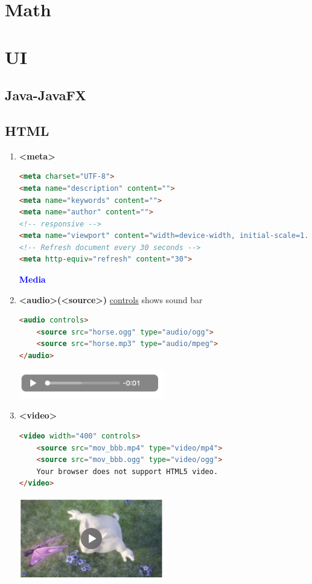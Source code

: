 \documentclass[12pt, a4paper]{report}
\begin{document}
\section{Math}




\section{UI}
    \subsection{Java-JavaFX}
    \subsection{HTML}
    \begin{enumerate}
        \item \textbf{<meta>}
        \begin{lstlisting}[language=HTML]
<meta charset="UTF-8">
<meta name="description" content="">
<meta name="keywords" content="">
<meta name="author" content="">
<!-- responsive -->
<meta name="viewport" content="width=device-width, initial-scale=1.0">
<!-- Refresh document every 30 seconds -->
<meta http-equiv="refresh" content="30">
        \end{lstlisting}
        
        \large{\textcolor{blue}{\textbf{Media}}}
        \item \textbf{<audio>(<source>)}
        \underline{controls} shows sound bar
        \begin{lstlisting}[language=HTML]
<audio controls>
    <source src="horse.ogg" type="audio/ogg">
    <source src="horse.mp3" type="audio/mpeg">
</audio>
        \end{lstlisting}
        \includegraphics[width=0.5\textwidth]{imgs/html_audio.png}
        
        \item \textbf{<video>}
        \begin{lstlisting}[language=HTML]
<video width="400" controls>
    <source src="mov_bbb.mp4" type="video/mp4">
    <source src="mov_bbb.ogg" type="video/ogg">
    Your browser does not support HTML5 video.
</video>
        \end{lstlisting}
        \includegraphics[width=0.5\textwidth]{imgs/html_video.png}
        

\end{enumerate}
\end{document}
